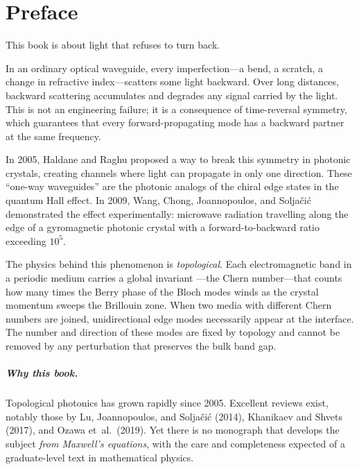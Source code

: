 
\chapter*{Preface}

This book is about light that refuses to turn back.

In an ordinary optical waveguide, every imperfection---a bend, a
scratch, a change in refractive index---scatters some light backward.
Over long distances, backward scattering accumulates and degrades any
signal carried by the light.  This is not an engineering failure; it is
a consequence of time-reversal symmetry, which guarantees that every
forward-propagating mode has a backward partner at the same frequency.

In 2005, Haldane and Raghu proposed a way to break this symmetry in
photonic crystals, creating channels where light can propagate in only
one direction.  These ``one-way waveguides'' are the photonic analogs of
the chiral edge states in the quantum Hall effect.  In 2009, Wang,
Chong, Joannopoulos, and Solja\v{c}i\'{c} demonstrated the effect
experimentally: microwave radiation travelling along the edge of a
gyromagnetic photonic crystal with a forward-to-backward ratio
exceeding $10^5$.

The physics behind this phenomenon is \emph{topological}.  Each
electromagnetic band in a periodic medium carries a global invariant
---the Chern number---that counts how many times the Berry phase of the
Bloch modes winds as the crystal momentum sweeps the Brillouin zone.
When two media with different Chern numbers are joined, unidirectional
edge modes necessarily appear at the interface.  The number and
direction of these modes are fixed by topology and cannot be removed by
any perturbation that preserves the bulk band gap.

\paragraph{Why this book.}

Topological photonics has grown rapidly since 2005.  Excellent reviews
exist, notably those by Lu, Joannopoulos, and Solja\v{c}i\'{c} (2014),
Khanikaev and Shvets (2017), and Ozawa et~al.\ (2019).  Yet there is no
monograph that develops the subject \emph{from Maxwell's equations},
with the care and completeness expected of a graduate-level text in
mathematical physics.

